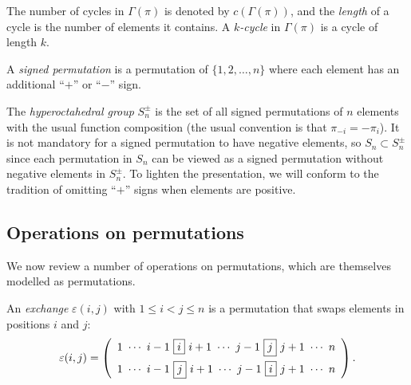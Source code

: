 \documentclass[review]{elsarticle}
\begin{document}


The number of cycles in $\Gamma(\pi)$ is denoted by $c(\Gamma(\pi))$, and the \emph{length} of a cycle is the number of elements it contains. A \emph{$k$-cycle} in $\Gamma(\pi)$ is a cycle of length $k$.

\begin{definition}
A \emph{signed permutation} is a permutation of $\{1, 2, \ldots, n\}$ where each element has an additional ``$+$'' or ``$-$'' sign. 
\end{definition}

The \emph{hyperoctahedral group} $S^{\pm}_n$ is the set of all 
signed permutations of $n$ elements 
with the usual function composition (the usual convention is that $\pi_{-i}=-\pi_i$). It is not mandatory for a signed permutation to have negative elements, so $S_n\subset S^{\pm}_n$ since each permutation in $S_n$ can be viewed as a signed permutation without negative elements in $S^\pm_n$. To lighten the presentation, we will conform to the tradition of omitting ``$+$'' signs when elements are positive.

\subsection{Operations on permutations}\label{sec:operations}

We now review a number of operations on permutations, which are themselves modelled as permutations.

\begin{definition}\label{def:exchange}
An \emph{exchange} $\varepsilon(i, j)$ with $1\leq i<j\leq n$ is a permutation that swaps elements in positions $i$ and $j$:
$$
\varepsilon(i, j)=\left(
\begin{array}{l}\renewcommand{\arraystretch}{1.3}
1\ \cdots\ i-1\ \fbox{$i$}\ i+1\ \cdots\ j-1\ \fbox{$j$}\ j+1\ \cdots\ n\\
\raisebox{-.05in}{$1\ \cdots\ i-1\ \fbox{$j$}\ i+1\ \cdots\ j-1\ \fbox{$i$}\ j+1\ \cdots\ n$}
\end{array}
\right).
$$
\end{definition}
\end{document}
